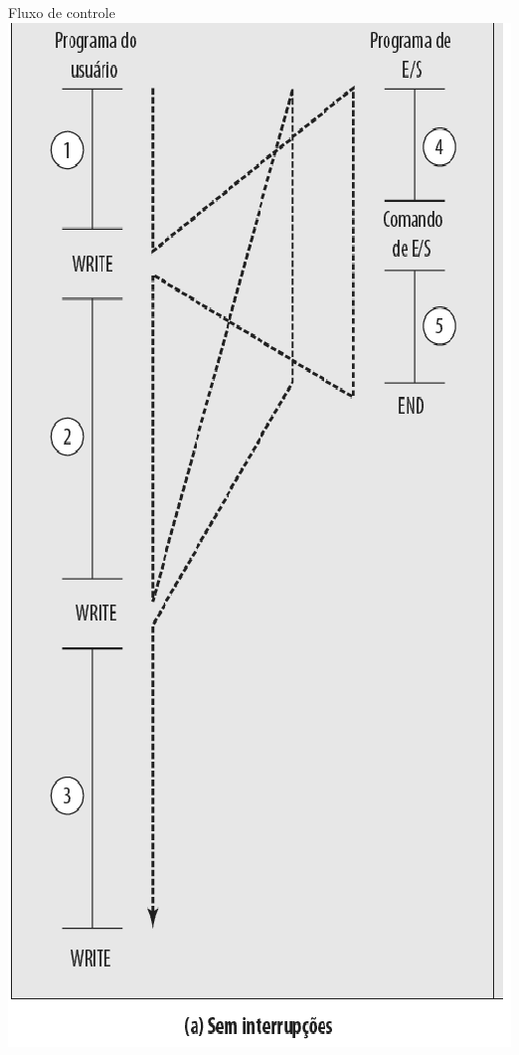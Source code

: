 \begin{slide}{Fluxo de controle}
   \centering
   \includegraphics[height=0.8\textheight]{figs/int01.eps}
   \pause

\end{slide}
